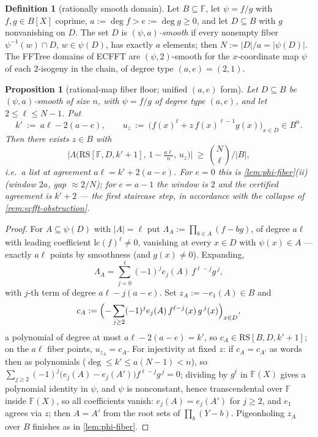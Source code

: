 \documentclass[11pt]{article}
\newtheorem{proposition}[proposition]{Proposition}
\theoremstyle{definition}
\newtheorem{definition}[definition]{Definition}
\theoremstyle{remark}
\newcommand{\F}{\mathbb{F}}
\newcommand{\B}{B}
\newcommand{\RS}{\mathrm{RS}}
\newcommand{\Lst}{\Lambda}
\newcommand{\eone}{e_1}
\begin{document}
\begin{definition}[rationally smooth domain]\label{def:rational-smooth}
Let $\B\subseteq\F$, let $\psi=f/g$ with $f,g\in\B[X]$ coprime, $a:=\deg f>e:=\deg g\ge0$, and let $D\subseteq\B$ with $g$ nonvanishing on $D$. The set $D$ is \emph{$(\psi,a)$-smooth} if every nonempty fiber $\psi^{-1}(w)\cap D$, $w\in\psi(D)$, has exactly $a$ elements; then $N:=|D|/a=|\psi(D)|$. The FFTree domains of ECFFT \cite{BCKL21} are $(\psi,2)$-smooth for the $x$-coordinate map $\psi$ of each $2$-isogeny in the chain, of degree type $(a,e)=(2,1)$.
\end{definition}

\begin{proposition}[rational-map fiber floor; unified $(a,e)$ form]\label{prop:rational-floor}
Let $D\subseteq\B$ be $(\psi,a)$-smooth of size $n$, with $\psi=f/g$ of degree type $(a,e)$, and let $2\le\ell\le N-1$. Put
\[
k'\ :=\ a\ell-2(a-e),
\qquad
u_z\ :=\ \bigl(f(x)^{\ell}+z\,f(x)^{\ell-1}g(x)\bigr)_{x\in D}\in\B^n .
\]
Then there exists $z\in\B$ with
\[
\bigl|\Lst\bigl(\RS[\F,D,k'+1],\,1-\tfrac{a\ell}n,\,u_z\bigr)\bigr|\ \ge\ \binom N{\ell}\Big/|\B| ,
\]
i.e.\ a list at agreement $a\ell=k'+2(a-e)$. For $e=0$ this is \cref{lem:phi-fiber}\textup{(ii)} \textup(window $2a$, gap $\approx2/N$\textup); for $e=a-1$ the window is $2$ and the certified agreement is $k'+2$ --- the first staircase step, in accordance with the collapse of \cref{rem:ecfft-obstruction}.
\end{proposition}

\begin{proof}
For $A\subseteq\psi(D)$ with $|A|=\ell$ put $\Lambda_A:=\prod_{b\in A}(f-bg)$, of degree $a\ell$ with leading coefficient $\mathrm{lc}(f)^\ell\ne0$, vanishing at every $x\in D$ with $\psi(x)\in A$ --- exactly $a\ell$ points by smoothness \textup(and $g(x)\ne0$\textup). Expanding,
\[
\Lambda_A=\sum_{j=0}^{\ell}(-1)^je_j(A)\,f^{\ell-j}g^{\,j},
\]
with $j$-th term of degree $a\ell-j(a-e)$. Set $z_A:=-\eone(A)\in\B$ and
\[
c_A:=\Bigl(-\sum_{j\ge2}(-1)^je_j(A)\,f^{\ell-j}(x)\,g^{\,j}(x)\Bigr)_{x\in D},
\]
a polynomial of degree at most $a\ell-2(a-e)=k'$, so $c_A\in\RS[\B,D,k'+1]$; on the $a\ell$ fiber points, $u_{z_A}=c_A$. For injectivity at fixed $z$: if $c_A=c_{A'}$ as words then as polynomials \textup($\deg\le k'\le a(N-1)<n$\textup), so $\sum_{j\ge2}(-1)^j\bigl(e_j(A)-e_j(A')\bigr)f^{\ell-j}g^{\,j}=0$; dividing by $g^{\ell}$ in $\F(X)$ gives a polynomial identity in $\psi$, and $\psi$ is nonconstant, hence transcendental over $\F$ inside $\F(X)$, so all coefficients vanish: $e_j(A)=e_j(A')$ for $j\ge2$, and $\eone$ agrees via $z$; then $A=A'$ from the root sets of $\prod_{b}(Y-b)$. Pigeonholing $z_A$ over $\B$ finishes as in \cref{lem:phi-fiber}.
\end{proof}
\end{document}

